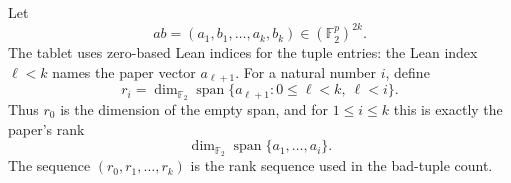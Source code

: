 \begin{definition}
Let
\[
  ab=(a_1,b_1,\ldots,a_k,b_k)\in(\mathbb F_2^p)^{2k}.
\]
The tablet uses zero-based Lean indices for the tuple entries: the Lean index
\(\ell<k\) names the paper vector \(a_{\ell+1}\). For a natural number \(i\),
define
\[
  r_i=\dim_{\mathbb F_2}
    \operatorname{span}\{a_{\ell+1}:0\le \ell<k,\ \ell<i\}.
\]
Thus \(r_0\) is the dimension of the empty span, and for \(1\le i\le k\) this is
exactly the paper's rank
\[
  \dim_{\mathbb F_2}\operatorname{span}\{a_1,\ldots,a_i\}.
\]
The sequence \((r_0,r_1,\ldots,r_k)\) is the rank sequence used in the
bad-tuple count.
\end{definition}
